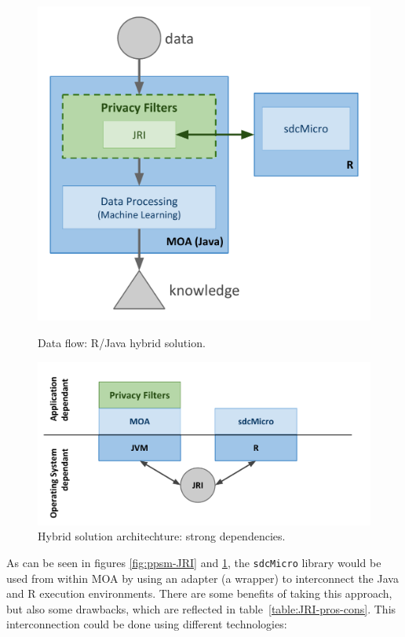 \begin{figure}[h]
	\centering
	\begin{minipage}[t]{.45\textwidth}
		\centering
		\includegraphics[width=1.0\textwidth]{figures/moa-ppsm-JRI.pdf}
		\caption{Data flow: R/Java hybrid solution.}
		\label{fig:ppsm-JRI}
	\end{minipage}\hfill
	\begin{minipage}[t]{.5\textwidth}
		\centering
		\includegraphics[width=1.2\textwidth]{figures/moa-ppsm-JRI-arch.pdf}
		\caption{Hybrid solution architechture: strong dependencies.}
		\label{fig:ppsm-JRI-arch}
	\end{minipage}
\end{figure}

As can be seen in figures \ref{fig:ppsm-JRI} and \ref{fig:ppsm-JRI-arch}, the \texttt{sdcMicro} library would be used from within MOA by using an adapter (a wrapper) to interconnect the Java and R execution environments. There are some benefits of taking this approach, but also some drawbacks, which are reflected in table~\ref{table:JRI-pros-cons}. This interconnection could be done using different technologies:

